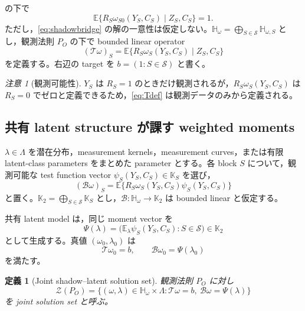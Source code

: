 \documentclass[11pt,a4paper]{ltjsarticle}
\newtheorem{definition}{定義}[section]
\theoremstyle{remark}
\newtheorem{remark}{注意}[section]
\newcommand{\E}{\mathbb E}
\newcommand{\cS}{\mathcal S}
\newcommand{\cZ}{\mathcal Z}
\newcommand{\Top}{\mathscr T}
\newcommand{\Bop}{\mathscr B}
\begin{document}
の下で
\begin{equation}
\E\{R_S\omega_{S0}(Y_S,C_S)\mid Z_S,C_S\}=1.
\label{eq:shadowbridge}
\end{equation}
ただし，\eqref{eq:shadowbridge} の解の一意性は仮定しない。$\mathbb H_\omega=\bigoplus_{S\in\cS}\mathbb H_{\omega,S}$ とし，観測法則 $P_O$ の下で bounded linear operator
\begin{equation}
(\Top\omega)_S
=\E\{R_S\omega_S(Y_S,C_S)\mid Z_S,C_S\}
\label{eq:Tdef}
\end{equation}
を定義する。右辺の target を $b=(1:S\in\cS)$ と書く。

\begin{remark}[観測可能性]
$Y_S$ は $R_S=1$ のときだけ観測されるが，$R_S\omega_S(Y_S,C_S)$ は $R_S=0$ でゼロと定義できるため，\eqref{eq:Tdef} は観測データのみから定義される。
\end{remark}

\subsection{共有 latent structure が課す weighted moments}
$\lambda\in\Lambda$ を潜在分布，measurement kernels，measurement curves，または有限 latent-class parameters をまとめた parameter とする。各 block $S$ について，観測可能な test function vector $\psi_S(Y_S,C_S)\in\mathbb K_S$ を選び，
\begin{equation}
(\Bop\omega)_S
=\E\{R_S\omega_S(Y_S,C_S)\psi_S(Y_S,C_S)\}
\label{eq:Bdef}
\end{equation}
と置く。$\mathbb K_2=\bigoplus_{S\in\cS}\mathbb K_S$ とし，$\Bop:\mathbb H_\omega\to\mathbb K_2$ は bounded linear と仮定する。

共有 latent model は，同じ moment vector を
\begin{equation}
\Psi(\lambda)=\bigl(\E_\lambda\psi_S(Y_S,C_S):S\in\cS\bigr)\in\mathbb K_2
\label{eq:Psidef}
\end{equation}
として生成する。真値 $(\omega_0,\lambda_0)$ は
\begin{equation}
\Top\omega_0=b,
\qquad
\Bop\omega_0=\Psi(\lambda_0)
\label{eq:jointpopulation}
\end{equation}
を満たす。

\begin{definition}[Joint shadow--latent solution set]\label{def:solutionset}
観測法則 $P_O$ に対し
\begin{equation}
\cZ(P_O)
=\{(\omega,\lambda)\in\mathbb H_\omega\times\Lambda:
\Top\omega=b,\ \Bop\omega=\Psi(\lambda)\}
\label{eq:solutionset}
\end{equation}
を joint solution set と呼ぶ。
\end{definition}
\end{document}
